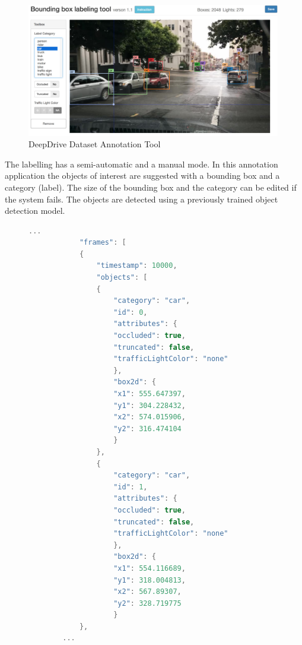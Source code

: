\begin{figure}[htp]
	
	\centering
	\includegraphics[width=0.99\textwidth]{capstate/imgs/berveleytool.png}
	
	\caption{DeepDrive Dataset Annotation Tool}
	\label{fig:berkeletool}
	
\end{figure}

The labelling has a semi-automatic and a manual mode. In this annotation application the objects of interest are suggested with a bounding box and a category (label). The size of the bounding box and the category can be edited if the system fails. The objects are detected using a previously trained object detection model. 

\begin{figure}
	\begin{center}
		\begin{lstlisting}[label={lst:berkelydata}, caption={DeepDrive dataset file snippet.},language=c++]
		...
		    "frames": [
		    {
			    "timestamp": 10000,
			    "objects": [
			    {
				    "category": "car",
				    "id": 0,
				    "attributes": {
				    "occluded": true,
				    "truncated": false,
				    "trafficLightColor": "none"
				    },
				    "box2d": {
				    "x1": 555.647397,
				    "y1": 304.228432,
				    "x2": 574.015906,
				    "y2": 316.474104
				    }
			    },
			    {
				    "category": "car",
				    "id": 1,
				    "attributes": {
				    "occluded": true,
				    "truncated": false,
				    "trafficLightColor": "none"
				    },
				    "box2d": {
				    "x1": 554.116689,
				    "y1": 318.004813,
				    "x2": 567.89307,
				    "y2": 328.719775
				    }
		    },
		...	\end{lstlisting}
	\end{center}
\end{figure}


